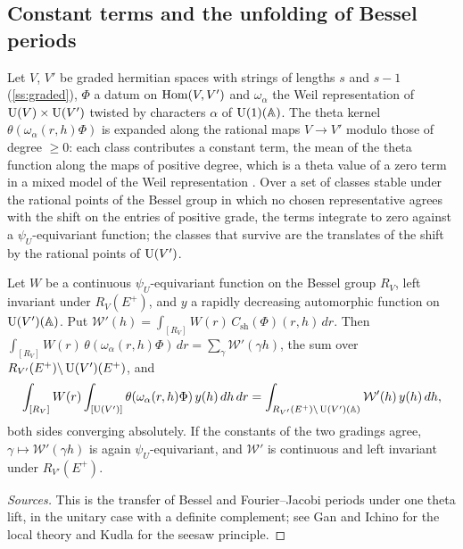 \subsection{Constant terms and the unfolding of Bessel periods}\label{ss:B-unfolding}
Let $V$, $V'$ be graded hermitian spaces with strings of lengths $s$ and $s-1$ (\cref{ss:graded}), $\Phi$ a datum on $\operatorname{Hom}(V,V')$ and
$\omega_\alpha$ the Weil representation of $\operatorname{U}(V)\times\operatorname{U}(V')$ twisted by characters $\alpha$ of $\operatorname{U}(1)(\mathbb{A})$. The theta kernel
$\theta(\omega_\alpha(r,h)\Phi)$ is expanded along the rational maps $V\to V'$ modulo those of degree $\ge0$: each class contributes a
constant term, the mean of the theta function along the maps of positive degree, which is a theta value of a zero term in a
mixed model of the Weil representation \cite{Weil1964}. Over a set of classes stable under the rational points of the Bessel group
in which no chosen representative agrees with the shift on the entries of positive grade, the terms integrate to zero against a
$\psi_U$-equivariant function; the classes that survive are the translates of the shift by the rational points of $\operatorname{U}(V')$.

\begin{proposition}\label{prop:B-unfolding}
Let $W$ be a continuous $\psi_U$-equivariant function on the Bessel group $R_V$, left invariant under $R_V(E^+)$, and $y$ a rapidly
decreasing automorphic function on $\operatorname{U}(V')(\mathbb{A})$. Put $\mathcal W'(h)=\int_{[R_V]}W(r)\,C_{\mathrm{sh}}(\Phi)(r,h)\,dr$. Then
$\int_{[R_V]}W(r)\,\theta(\omega_\alpha(r,h)\Phi)\,dr=\sum_\gamma\mathcal W'(\gamma h)$, the sum over $R_{V'}(E^+)\backslash\operatorname{U}(V')(E^+)$, and
\[
  \int_{[R_V]}W(r)\int_{[\operatorname{U}(V')]}\theta(\omega_\alpha(r,h)\Phi)\,y(h)\,dh\,dr=\int_{R_{V'}(E^+)\backslash\operatorname{U}(V')(\mathbb{A})}\mathcal W'(h)\,y(h)\,dh,
\]
both sides converging absolutely. If the constants of the two gradings agree, $\gamma\mapsto\mathcal W'(\gamma h)$ is again
$\psi_U$-equivariant, and $\mathcal W'$ is continuous and left invariant under $R_{V'}(E^+)$.
\end{proposition}

\begin{proof}[Sources]
This is the transfer of Bessel and Fourier--Jacobi periods under one theta lift, in the unitary case with a definite complement;
see Gan and Ichino \cite{GanIchino2016} for the local theory and Kudla \cite{Kudla1984} for the seesaw principle.
\end{proof}

